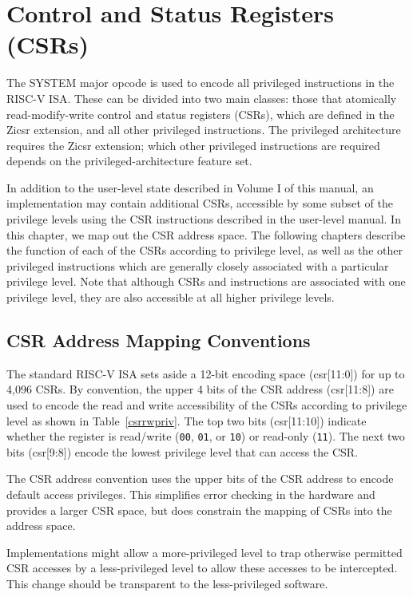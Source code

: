 \chapter{Control and Status Registers (CSRs)}
\label{chap:priv-csrs}

The SYSTEM major opcode is used to encode all privileged instructions
in the RISC-V ISA.
These can be divided into two main classes: those that atomically
read-modify-write control and status registers (CSRs), which are defined in
the Zicsr extension, and all other privileged instructions.
The privileged architecture requires the Zicsr extension; which other
privileged instructions are required depends on the privileged-architecture
feature set.

In addition to the user-level
state described in Volume I of this manual, an implementation may
contain additional CSRs, accessible by some subset of the privilege
levels using the CSR instructions described in the user-level manual.
In this chapter, we map out the CSR address space.  The following
chapters describe the function of each of the CSRs according to
privilege level, as well as the other privileged instructions which
are generally closely associated with a particular privilege level.
Note that although CSRs and instructions are associated with one
privilege level, they are also accessible at all higher privilege
levels.

\section{CSR Address Mapping Conventions}

The standard RISC-V ISA sets aside a 12-bit encoding space (csr[11:0])
for up to 4,096 CSRs.  By convention, the upper 4 bits of the CSR
address (csr[11:8]) are used to encode the read and write
accessibility of the CSRs according to privilege level as shown in
Table~\ref{csrrwpriv}.  The top two bits (csr[11:10]) indicate whether
the register is read/write ({\tt 00}, {\tt 01}, or {\tt 10}) or
read-only ({\tt 11}).  The next two bits (csr[9:8]) encode the lowest
privilege level that can access the CSR.

\begin{commentary}
The CSR address convention uses the upper bits of the CSR address to
encode default access privileges.  This simplifies error checking in
the hardware and provides a larger CSR space, but does constrain the
mapping of CSRs into the address space.

Implementations might allow a more-privileged level to trap otherwise
permitted CSR accesses by a less-privileged level to allow these
accesses to be intercepted.  This change should be transparent to the
less-privileged software.
\end{commentary}

